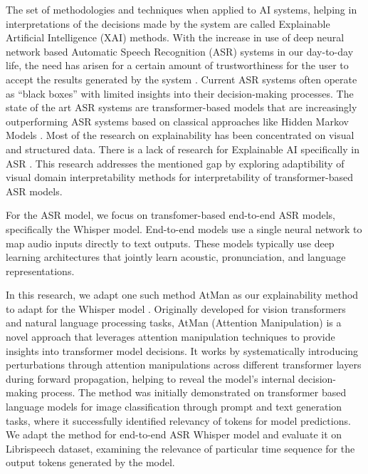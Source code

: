 \documentclass[../report.tex]{subfiles}
\begin{document}
    The set of methodologies and techniques when applied to AI systems, helping in interpretations of the decisions made by the system are called Explainable Artificial Intelligence (XAI) methods. With the increase in use of deep neural network based Automatic Speech Recognition (ASR) systems in our day-to-day life, the need has arisen for a certain amount of trustworthiness for the user to accept the results generated by the system \cite{doi:10.34133/icomputing.0074}. Current ASR systems often operate as ``black boxes'' with limited insights into their decision-making processes. The state of the art ASR systems are transformer-based models that are increasingly outperforming ASR systems based on classical approaches like Hidden Markov Models \cite{10143311}. Most of the research on explainability has been concentrated on visual and structured data. There is a lack of research for Explainable AI specifically in ASR \cite{doi:10.34133/icomputing.0074,10094635,10143311}. This research addresses the mentioned gap by exploring adaptibility of visual domain interpretability methods for interpretability of transformer-based ASR models.

    For the ASR model, we focus on transfomer-based end-to-end ASR models, specifically the Whisper \cite{radford2023robust} model. End-to-end models use a single neural network to map audio inputs directly to text outputs. These models typically use deep learning architectures that jointly learn acoustic, pronunciation, and language representations.

    In this research, we adapt one such method AtMan \cite{NEURIPS2023_c83bc020} as our explainability method to adapt for the Whisper model \cite{radford2023robust}. Originally developed for vision transformers and natural language processing tasks, AtMan (Attention Manipulation) is a novel approach that leverages attention manipulation techniques to provide insights into transformer model decisions. It works by systematically introducing perturbations through attention manipulations across different transformer layers during forward propagation, helping to reveal the model's internal decision-making process. The method was initially demonstrated on transformer based language models for image classification through prompt and text generation tasks, where it successfully identified relevancy of tokens for model predictions. We adapt the method for end-to-end ASR Whisper model and evaluate it on Librispeech \cite{panayotov2015librispeech} dataset, examining the relevance of particular time sequence for the output tokens generated by the model.
\end{document}
